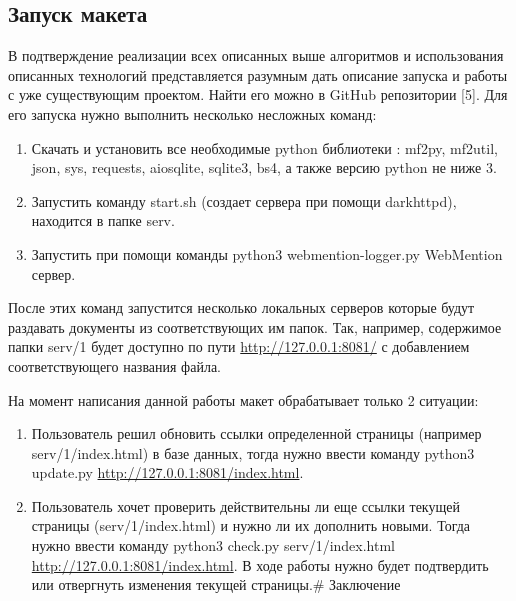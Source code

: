 \hypertarget{ux437ux430ux43fux443ux441ux43a-ux43cux430ux43aux435ux442ux430}{%
\subsection{Запуск
макета}\label{ux437ux430ux43fux443ux441ux43a-ux43cux430ux43aux435ux442ux430}}

В подтверждение реализации всех описанных выше алгоритмов и
использования описанных технологий представляется разумным дать описание
запуска и работы с уже существующим проектом. Найти его можно в GitHub
репозитории {[}5{]}. Для его запуска нужно выполнить несколько несложных
команд:

\begin{enumerate}
\def\labelenumi{\arabic{enumi}.}
\tightlist
\item
  Скачать и установить все необходимые python библиотеки : mf2py,
  mf2util, json, sys, requests, aiosqlite, sqlite3, bs4, а также версию
  python не ниже 3.
\item
  Запустить команду start.sh (создает сервера при помощи darkhttpd),
  находится в папке serv.
\item
  Запустить при помощи команды python3 webmention-logger.py WebMention
  сервер.
\end{enumerate}

После этих команд запустится несколько локальных серверов которые будут
раздавать документы из соответствующих им папок. Так, например,
содержимое папки serv/1 будет доступно по пути
\url{http://127.0.0.1:8081/} с добавлением соответствующего названия
файла.

На момент написания данной работы макет обрабатывает только 2 ситуации:

\begin{enumerate}
\def\labelenumi{\arabic{enumi}.}
\tightlist
\item
  Пользователь решил обновить ссылки определенной страницы (например
  serv/1/index.html) в базе данных, тогда нужно ввести команду python3
  update.py \url{http://127.0.0.1:8081/index.html}.
\item
  Пользователь хочет проверить действительны ли еще ссылки текущей
  страницы (serv/1/index.html) и нужно ли их дополнить новыми. Тогда
  нужно ввести команду python3 check.py serv/1/index.html
  \url{http://127.0.0.1:8081/index.html}. В ходе работы нужно будет
  подтвердить или отвергнуть изменения текущей страницы.\# Заключение
\end{enumerate}

